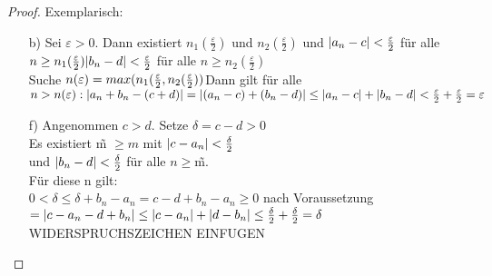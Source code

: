 \begin{proof}
Exemplarisch:\\
\begin{enumerate}
\item[b)] Sei $\varepsilon > 0$. Dann existiert $n_1(\frac{\varepsilon}{2})$ und $n_2(\frac{\varepsilon}{2})$ und $\lvert a_n -c \rvert < \frac{\varepsilon}{2}$ f\"ur alle $n \geq n_1(\frac{\varepsilon}{2})\\
\lvert b_n-d \rvert < \frac{\varepsilon}{2}$ f\"ur alle $n \geq n_2(\frac{\varepsilon}{2})$\\
Suche $n(\varepsilon) = max (n_1(\frac{\varepsilon}{2},n_2(\frac{\varepsilon}{2}))\\
$Dann gilt f\"ur alle $n > n(\varepsilon):\\
\lvert a_n+b_n - (c+d) \rvert = \lvert (a_n -c) + (b_n -d) \rvert \leq \lvert a_n -c \rvert + \lvert b_n -d \rvert < \frac{\varepsilon}{2} + \frac{\varepsilon}{2} = \varepsilon$
\item[f)]Angenommen $c > d$. Setze $\delta = c -d >0$\\
Es existiert \~m $ \geq m$ mit $\lvert c -a_n \rvert < \frac{\delta}{2}$\\
und $\lvert b_n -d \rvert < \frac{\delta}{2}$ f\"ur alle $n \geq$\~m.\\
F\"ur diese n gilt:\\
$0 < \delta \leq \delta + b_n - a_n = c -d+b_n -a_n \geq 0$ nach Voraussetzung\\
$= \lvert c -a_n - d +b_n \rvert \leq \lvert c-a_n \rvert + \lvert d -b_n \rvert\\
\leq \frac{\delta}{2} + \frac{\delta}{2} = \delta$ WIDERSPRUCHSZEICHEN EINFUGEN
\end{enumerate}
\end{proof}

